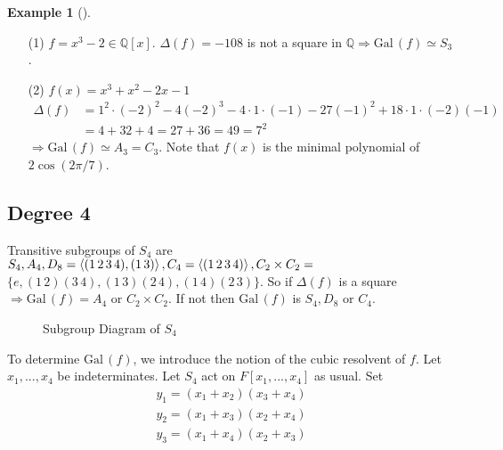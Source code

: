 \documentclass{article}
\theoremstyle{definition}
\newtheorem{ex}{Example}
\newenvironment{exs}[1][]{%
  \begin{ex}[#1]$ $\par\nobreak\ignorespaces
}{%
  \end{ex}
}
\newcommand{\QQ}{\mathbb Q}
\newcommand{\Ra}{\Rightarrow}
\newcommand{\Gal}{\text{Gal}\,}
\begin{document}
\begin{exs}
	\begin{enumerate}
		\item[(1)] $f = x^3 - 2 \in \QQ[x]$.
			$\Delta(f) = - 108$ is not a square in $\QQ \Ra \Gal(f) \simeq S_3$.

		\item[(2)] $f(x) = x^3 + x^2 - 2x - 1$
			\[
				\begin{split}
					\Delta(f) &= 1^2 \cdot (-2)^2 - 4 (-2)^3 - 4 \cdot 1 \cdot (-1) - 27 (-1)^2 + 18 \cdot 1 \cdot (-2)(-1)\\
					&= 4 + 32 + 4 = 27 + 36 = 49 = 7^2
				\end{split}
			\]
			$\Ra \Gal(f) \simeq A_3 = C_3$.
			Note that $f(x)$ is the minimal polynomial of $2 \cos (2 \pi/7)$.

	\end{enumerate}
\end{exs}

\subsection*{Degree 4}
Transitive subgroups of $S_4$ are $S_4, A_4, D_8 = \ev{(1 \, 2 \, 3 \, 4), (1 \, 3)}, C_4 = \ev{(1 \, 2 \, 3 \, 4)}, C_2 \times C_2 = $ \\
$\{e, (1 \, 2) (3 \, 4), (1 \, 3) (2 \, 4), (1 \, 4) (2 \, 3)\}$.
So if $\Delta(f)$ is a square $\Ra \Gal(f) = A_4$ or $C_2 \times C_2$.
If not then $\Gal(f)$ is $S_4, D_8$ or $C_4$.

\begin{figure}[H]
	\centering
	\caption{Subgroup Diagram of $S_4$}
\end{figure}

\par To determine $\Gal(f)$, we introduce the notion of the cubic resolvent of $f$.
Let $x_1, ..., x_4$ be indeterminates.
Let $S_4$ act on $F[x_1, ..., x_4]$ as usual.
Set 
\[
	\begin{split}
		y_1 = (x_1 + x_2) (x_3 + x_4)\\
		y_2 = (x_1 + x_3) (x_2 + x_4)\\
		y_3 = (x_1 + x_4) (x_2 + x_3)
	\end{split}
\]
\end{document}
